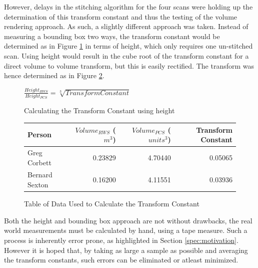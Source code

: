 However, delays in the stitching algorithm  for the four scans were holding up the determination of this transform constant and thus the testing of the volume rendering approach. 
As such, a slightly different approach was taken. Instead of measuring a bounding box two ways, the transform constant would be determined as in Figure \ref{testing: calculating the transform constant using height} in terms of height, which only requires one un-stitched scan. Using height would result in the cube root of the transform constant for a direct volume to volume transform, but this is easily rectified. The transform was hence determined as in Figure \ref{testing: table of data used to calculate the transform constant}.\\

\begin{figure}[h]
\begin{center}
$\frac{Height_{RWS}}{Height_{PCS}} = \sqrt[3]{Transform Constant}$
\end{center}
\caption{Calculating the Transform Constant using height}
\label{testing: calculating the transform constant using height}
\end{figure}

\begin{figure}[h]
\begin{center}
  \begin{tabular}{| l | r | r | r |}
    \hline
    Person & $Volume_{RWS}$ ($m^3$) & $Volume_{PCS}$ ($units^3$) & Transform Constant \\ \hline
    Greg Corbett 	& 0.23829 & 4.70440 & 0.05065\\ \hline
    Bernard Sexton 	& 0.16200 & 4.11551 & 0.03936\\ \hline
  \end{tabular}
\end{center}
\caption{Table of Data Used to Calculate the Transform Constant}
\label{testing: table of data used to calculate the transform constant}
\end{figure}

Both the height and bounding box approach are not without drawbacks, the real world measurements must be calculated by hand, using a tape measure. 
Such a process is inherently error prone, as highlighted in Section \ref{spec:motivation}. 
However it is hoped that, by taking as large a sample as possible and averaging the transform constants, such errors can be eliminated or atleast minimized.\\



